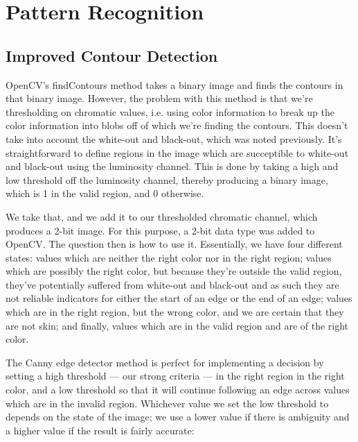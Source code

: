\chapter{Pattern Recognition}

\ifpdf
    \graphicspath{{Chapter2/Figs/Raster/}{Chapter2/Figs/PDF/}{Chapter2/Figs/}}
\else
    \graphicspath{{Chapter2/Figs/Vector/}{Chapter2/Figs/}}
\fi

\section{Improved Contour Detection}\label{sec:ImprovedContourDetection}

OpenCV's findContours method takes a binary image and finds the contours in that binary image. However, the problem with this method is that we're thresholding on chromatic values, i.e. using color information to break up the color information into blobs off of which we're finding the contours. This doesn't take into account the white-out and black-out, which was noted previously. It's straightforward to define regions in the image which are succeptible to white-out and black-out using the luminosity channel. This is done by taking a high and low threshold off the luminosity channel, thereby producing a binary image, which is 1 in the valid region, and 0 otherwise.

We take that, and we add it to our thresholded chromatic channel, which produces a 2-bit image. For this purpose, a 2-bit data type was added to OpenCV. The question then is how to use it. Essentially, we have four different states: values which are neither the right color nor in the right region; values which are possibly the right color, but because they're outside the valid region, they've potentially suffered from white-out and black-out and as such they are not reliable indicators for either the start of an edge or the end of an edge; values which are in the right region, but the wrong color, and we are certain that they are not skin; and finally, values which are in the valid region and are of the right color.

The Canny edge detector method is perfect for implementing a decision by setting a high threshold --- our strong criteria --- in the right region in the right color, and a low threshold so that it will continue following an edge across values which are in the invalid region. Whichever value we set the low threshold to depends on the state of the image; we use a lower value if there is ambiguity and a higher value if the result is fairly accurate:

